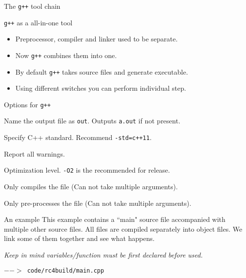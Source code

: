 \begin{frame}{The \texttt{g++} tool chain}
\begin{block}{\texttt{g++} as a all-in-one tool}
	\vspace{-0.07in}
	\begin{itemize}
		\item Preprocessor, compiler and linker used to be separate.
		\item Now \texttt{g++} combines them into one.
		\item By default \texttt{g++} takes source files and generate executable.
		\item Using different switches you can perform individual step.
	\end{itemize}
\end{block}
\vspace{-0.15in}
\begin{block}{Options for \texttt{g++}}
	\vspace{-0.07in}
	\begin{description}[-O\{0123\}]
		\small
		\item[-o out] Name the output file as \texttt{out}. Outputs \texttt{a.out} if not present.
		\item[-std=] Specify C++ standard. Recommend \texttt{-std=c++11}.
		\item[-Wall] Report all warnings.
		\item[-O\{0123\}] Optimization level. \texttt{-O2} is the recommended for release.
		\item[-c] Only compiles the file (Can not take multiple arguments).
		\item[-E] Only pre-processes the file (Can not take multiple arguments).
	\end{description}
\end{block}
\end{frame}

\begin{frame}[fragile]{An example}
This example contains a ``main" source file accompanied with multiple other source files. All files are compiled separately into object files. We link some of them together and see what happens.

\vspace{0.04in}
\textit{Keep in mind variables/function must be first declared before used.}

\vspace{0.04in}
\texttt{$-->$ code/rc4build/main.cpp}
\inputminted{c++}{code/rc4build/main.cpp}
\end{frame}

